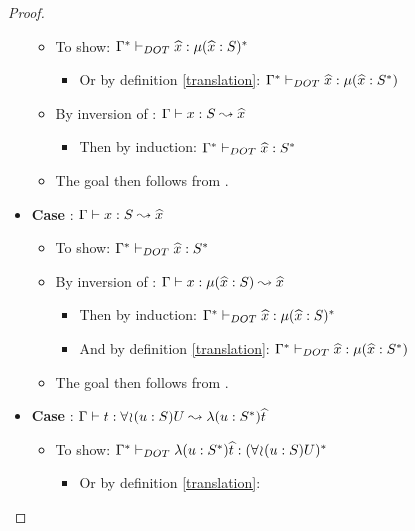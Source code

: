 \begin{proof}
\begin{itemize}
        \begin{itemize}
            \item To show:
                $\Gamma^{*} \vdash_{DOT} \widehat{x}: \mu(\widehat{x} : S)^{*}$
            \begin{itemize}
                \item Or by definition \ref{translation}:
                    $\Gamma^{*} \vdash_{DOT} \widehat{x}: \mu(\widehat{x} : S^{*})$
            \end{itemize}
            \item By inversion of : $\Gamma \vdash x: S \leadsto \widehat{x}$
            \begin{itemize}
                \item Then by induction:
                    $\Gamma^{*} \vdash_{DOT} \widehat{x}: S^{*}$
            \end{itemize}
            \item The goal then follows from .
        \end{itemize}
        \item \textbf{Case} : $\Gamma \vdash x: S \leadsto \widehat{x}$
        \begin{itemize}
            \item To show: $\Gamma^{*} \vdash_{DOT} \widehat{x}: S^{*}$
            \item By inversion of :
                $\Gamma \vdash x: \mu(\widehat{x} : S) \leadsto \widehat{x}$
            \begin{itemize}
                \item Then by induction:
                    $\Gamma^{*} \vdash_{DOT} \widehat{x}: \mu(\widehat{x} : S)^{*}$
                \item And by definition \ref{translation}:
                    $\Gamma^{*} \vdash_{DOT} \widehat{x}: \mu(\widehat{x} : S^{*})$
            \end{itemize}
            \item The goal then follows from .
        \end{itemize}
        \item \textbf{Case} :
            $\Gamma \vdash t: \forall\!\wr\!(u:S)U \leadsto \lambda(u:S^{*})\widehat{t}$
        \begin{itemize}
            \item To show: $\Gamma^{*} \vdash_{DOT} \lambda(u:S^{*})\widehat{t}: (\forall\!\wr\!(u:S)U)^{*}$
            \begin{itemize}
                \item Or by definition \ref{translation}:

\end{itemize}
\end{itemize}
\end{itemize}
\end{proof}
